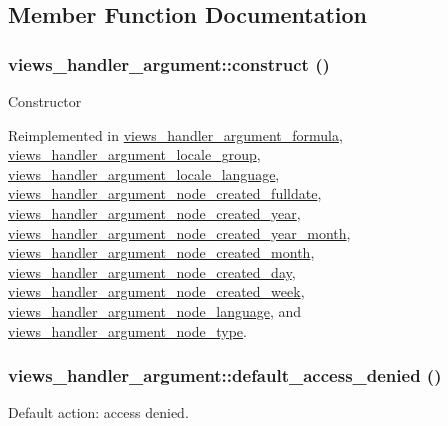 \subsection{Member Function Documentation}
\hypertarget{classviews__handler__argument_a93594a31e95e1a14cead4f038d7b321b}{
\subsubsection[{construct}]{\setlength{\rightskip}{0pt plus 5cm}views\_\-handler\_\-argument::construct ()}}
\label{classviews__handler__argument_a93594a31e95e1a14cead4f038d7b321b}
Constructor 

Reimplemented in \hyperlink{classviews__handler__argument__formula_a01284402427de2bcfa1b1da5792a2332}{views\_\-handler\_\-argument\_\-formula}, \hyperlink{classviews__handler__argument__locale__group_a5dd96da33f67166727c6af6547ccbb7a}{views\_\-handler\_\-argument\_\-locale\_\-group}, \hyperlink{classviews__handler__argument__locale__language_ade5af4ea7ada57c6716a6712bbc767c5}{views\_\-handler\_\-argument\_\-locale\_\-language}, \hyperlink{classviews__handler__argument__node__created__fulldate_af5b74c0204c9da9285cbe3e07ebed345}{views\_\-handler\_\-argument\_\-node\_\-created\_\-fulldate}, \hyperlink{classviews__handler__argument__node__created__year_aa40b34ab0d297264f7378fc995e06bc7}{views\_\-handler\_\-argument\_\-node\_\-created\_\-year}, \hyperlink{classviews__handler__argument__node__created__year__month_a9e090c0caf0a169fe3f9a78160896d01}{views\_\-handler\_\-argument\_\-node\_\-created\_\-year\_\-month}, \hyperlink{classviews__handler__argument__node__created__month_a0f9b4da1f37a58ca3e416667dc8d9bbb}{views\_\-handler\_\-argument\_\-node\_\-created\_\-month}, \hyperlink{classviews__handler__argument__node__created__day_aeb33813a3cc0da642e45a12625da5bde}{views\_\-handler\_\-argument\_\-node\_\-created\_\-day}, \hyperlink{classviews__handler__argument__node__created__week_ae90c3f8a723cfa081198075d2fe67c52}{views\_\-handler\_\-argument\_\-node\_\-created\_\-week}, \hyperlink{classviews__handler__argument__node__language_a96f52469109294ad151b3ca21c261795}{views\_\-handler\_\-argument\_\-node\_\-language}, and \hyperlink{classviews__handler__argument__node__type_a46ce861fa61b59bb22f001501c3b2650}{views\_\-handler\_\-argument\_\-node\_\-type}.\hypertarget{classviews__handler__argument_ae2921604aa74d8050c68938d6e467472}{
\subsubsection[{default\_\-access\_\-denied}]{\setlength{\rightskip}{0pt plus 5cm}views\_\-handler\_\-argument::default\_\-access\_\-denied ()}}
\label{classviews__handler__argument_ae2921604aa74d8050c68938d6e467472}
Default action: access denied.

